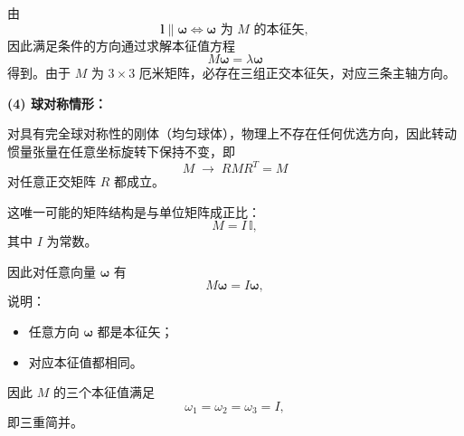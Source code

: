 \begin{solution}[转动惯量矩阵与角动量的本征结构]
由
\[
\mathbf l\parallel \boldsymbol\omega \iff \boldsymbol\omega \text{ 为 } M \text{ 的本征矢},
\]
因此满足条件的方向通过求解本征值方程
\[
M\boldsymbol\omega=\lambda \boldsymbol\omega
\]
得到。由于 $M$ 为 $3\times3$ 厄米矩阵，必存在三组正交本征矢，对应三条主轴方向。

\vspace{0.3em}
\textbf{(4) 球对称情形：}

对具有完全球对称性的刚体（均匀球体），物理上不存在任何优选方向，因此转动惯量张量在任意坐标旋转下保持不变，即
\[
M \;\to\; RMR^T = M
\]
对任意正交矩阵 $R$ 都成立。

这唯一可能的矩阵结构是与单位矩阵成正比：
\[
M = I\,\mathbb{I},
\]
其中 $I$ 为常数。

因此对任意向量 $\boldsymbol\omega$ 有
\[
M\boldsymbol\omega = I\boldsymbol\omega,
\]
说明：
\begin{itemize}
\item 任意方向 $\boldsymbol\omega$ 都是本征矢；
\item 对应本征值都相同。
\end{itemize}

因此 $M$ 的三个本征值满足
\[
\omega_1=\omega_2=\omega_3=I,
\]
即三重简并。
\end{solution}


